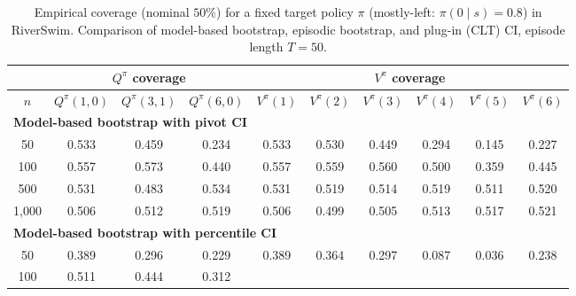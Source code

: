 \documentclass{article}
\numberwithin{equation}{section}
\begin{document}
\begin{table}[ht]
\centering
\caption{Empirical coverage (nominal $50\%$) for a fixed target policy $\pi$ (mostly-left: $\pi(0\mid s)=0.8$) in RiverSwim. Comparison of model-based bootstrap, episodic bootstrap, and plug-in (CLT) CI, episode length $T=50$.}
\label{tab:riverswim-mostly-left-coverage-50}
\begin{tabular}{c|ccc|cccccc}
\hline
& \multicolumn{3}{c|}{$Q^\pi$ coverage} & \multicolumn{6}{c}{$V^\pi$ coverage} \\ \hline
$n$
& $Q^\pi(1,0)$ & $Q^\pi(3,1)$ & $Q^\pi(6,0)$
& $V^\pi(1)$ & $V^\pi(2)$ & $V^\pi(3)$ & $V^\pi(4)$ & $V^\pi(5)$ & $V^\pi(6)$ \\
\hline
\multicolumn{10}{l}{\textbf{Model-based bootstrap with pivot CI}} \\ \hline
50
& \cellcolor{covheat!100!white}0.533 & \cellcolor{covheat!80!white}0.459 & 0.234
& \cellcolor{covheat!100!white}0.533 & \cellcolor{covheat!100!white}0.530 & \cellcolor{covheat!75!white}0.449 & 0.294 & 0.145 & 0.227 \\
100
& \cellcolor{covheat!100!white}0.557 & \cellcolor{covheat!100!white}0.573 & \cellcolor{covheat!70!white}0.440
& \cellcolor{covheat!100!white}0.557 & \cellcolor{covheat!100!white}0.559 & \cellcolor{covheat!100!white}0.560 & \cellcolor{covheat!100!white}0.500 & \cellcolor{covheat!30!white}0.359 & \cellcolor{covheat!73!white}0.445 \\
500
& \cellcolor{covheat!100!white}0.531 & \cellcolor{covheat!91!white}0.483 & \cellcolor{covheat!100!white}0.534
& \cellcolor{covheat!100!white}0.531 & \cellcolor{covheat!100!white}0.519 & \cellcolor{covheat!100!white}0.514 & \cellcolor{covheat!100!white}0.519 & \cellcolor{covheat!100!white}0.511 & \cellcolor{covheat!100!white}0.520 \\
1{,}000
& \cellcolor{covheat!100!white}0.506 & \cellcolor{covheat!100!white}0.512 & \cellcolor{covheat!100!white}0.519
& \cellcolor{covheat!100!white}0.506 & \cellcolor{covheat!100!white}0.499 & \cellcolor{covheat!100!white}0.505 & \cellcolor{covheat!100!white}0.513 & \cellcolor{covheat!100!white}0.517 & \cellcolor{covheat!100!white}0.521 \\
\hline
\multicolumn{10}{l}{\textbf{Model-based bootstrap with percentile CI}} \\ \hline
50
& \cellcolor{covheat!45!white}0.389 & 0.296 & 0.229
& \cellcolor{covheat!45!white}0.389 & \cellcolor{covheat!32!white}0.364 & 0.297 & 0.087 & 0.036 & 0.238 \\
100
& \cellcolor{covheat!100!white}0.511 & \cellcolor{covheat!72!white}0.444 & \cellcolor{covheat!6!white}0.312

\end{tabular}
\end{table}
\end{document}
